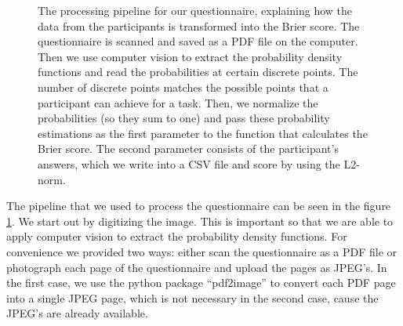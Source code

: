 \documentclass[../main/main.tex]{subfiles}
\begin{document}
\begin{figure}[h]
	\caption{The processing pipeline for our questionnaire, explaining how the data from the participants is transformed into the Brier score. The questionnaire is scanned and saved as a PDF file on the computer. Then we use computer vision to extract the probability density functions and read the probabilities at certain discrete points. The number of discrete points matches the possible points that a participant can achieve for a task. Then, we normalize the probabilities (so they sum to one) and pass these probability estimations as the first parameter to the function that calculates the Brier score. The second parameter consists of the participant's answers, which we write into a CSV file and score by using the L2-norm.}
	\label{fig:processing}
	\end{figure}

	The pipeline that we used to process the questionnaire can be seen in the figure \ref{fig:processing}. We start out by digitizing the image. This is important so that we are able to apply computer vision to extract the probability density functions. For convenience we provided two ways: either scan the questionnaire as a PDF file or photograph each page of the questionnaire and upload the pages as JPEG's. In the first case, we use the python package ``pdf2image'' to convert each PDF page into a single JPEG page, which is not necessary in the second case, cause the JPEG's are already available.  
\end{document}
